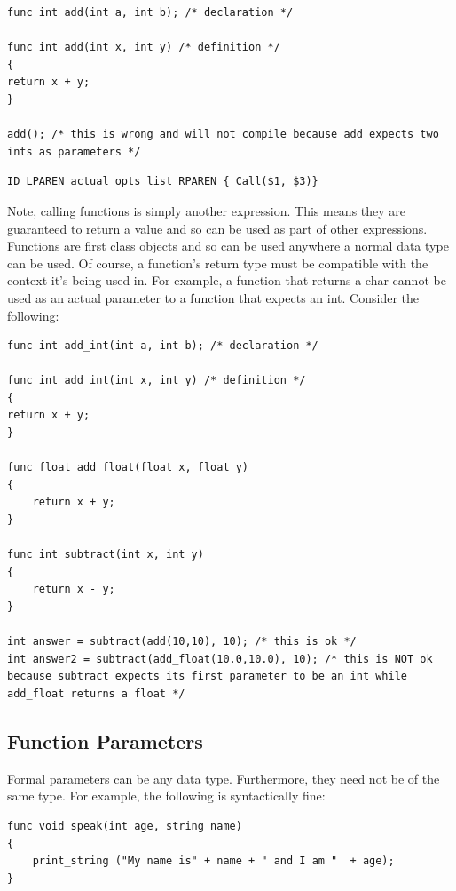 \documentclass{article}
\begin{document}
\begin{lstlisting}
func int add(int a, int b); /* declaration */

func int add(int x, int y) /* definition */
{
return x + y;
}

add(); /* this is wrong and will not compile because add expects two ints as parameters */

\end{lstlisting}

\begin{Verbatim}[frame=single]
	 ID LPAREN actual_opts_list RPAREN { Call($1, $3)}
\end{Verbatim}

Note, calling functions is simply another expression. This means they are guaranteed to return a value and so can be used as part of other expressions.
Functions are first class objects and so can be used anywhere a normal data type can be used. Of course, a function's return type must be compatible with the context it's being used in. For example, a function that returns a char cannot be used as an actual parameter to a function that expects an int.  Consider the following:

\begin{lstlisting}
func int add_int(int a, int b); /* declaration */

func int add_int(int x, int y) /* definition */
{
return x + y;
}

func float add_float(float x, float y)
{
	return x + y;
}

func int subtract(int x, int y)
{
	return x - y;
}

int answer = subtract(add(10,10), 10); /* this is ok */
int answer2 = subtract(add_float(10.0,10.0), 10); /* this is NOT ok because subtract expects its first parameter to be an int while add_float returns a float */

\end{lstlisting}

\subsection{Function Parameters}
Formal parameters can be any data type. Furthermore, they need not be of the same type. For example, the following is syntactically fine:

\begin{lstlisting}
func void speak(int age, string name)
{
	print_string ("My name is" + name + " and I am "  + age);
}
\end{lstlisting}
\end{document}

